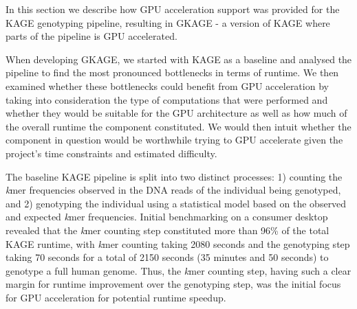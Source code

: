 In this section we describe how GPU acceleration support was provided for the KAGE genotyping pipeline, resulting in GKAGE - a version of KAGE where parts of the pipeline is GPU accelerated.

When developing GKAGE, we started with KAGE as a baseline and analysed the pipeline to find the most pronounced bottlenecks in terms of runtime.
We then examined whether these bottlenecks could benefit from GPU acceleration by taking into consideration the type of computations that were performed and whether they would be suitable for the GPU architecture as well as how much of the overall runtime the component constituted. 
We would then intuit whether the component in question would be worthwhile trying to GPU accelerate given the project's time constraints and estimated difficulty.

The baseline KAGE pipeline is split into two distinct processes: 1) counting the \textit{k}mer frequencies observed in the DNA reads of the individual being genotyped, and 2) genotyping the individual using a statistical model based on the observed and expected \textit{k}mer frequencies.
Initial benchmarking on a consumer desktop revealed that the \textit{k}mer counting step constituted more than 96\% of the total KAGE runtime, with \textit{k}mer counting taking 2080 seconds and the genotyping step taking 70 seconds for a total of 2150 seconds (35 minutes and 50 seconds) to genotype a full human genome.
Thus, the \textit{k}mer counting step, having such a clear margin for runtime improvement over the genotyping step, was the initial focus for GPU acceleration for potential runtime speedup.
